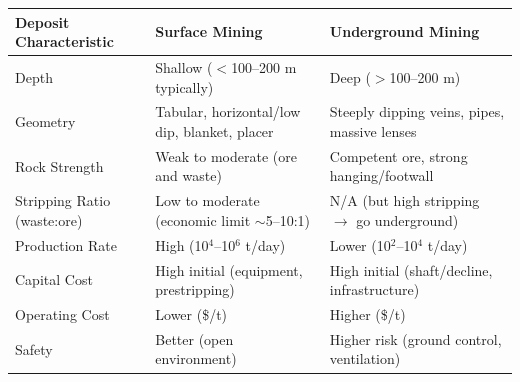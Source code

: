 \documentclass[11pt]{article}
\begin{document}
\begin{propriete}
\begin{center}
\begin{tabularx}{\linewidth}{|l|X|X|}
\hline
\rowcolor{popblueL} \textbf{Deposit Characteristic} & \textbf{Surface Mining} & \textbf{Underground Mining} \\
\hline
Depth & Shallow ($<$100--200 m typically) & Deep ($>$100--200 m) \\
\hline
Geometry & Tabular, horizontal/low dip, blanket, placer & Steeply dipping veins, pipes, massive lenses \\
\hline
Rock Strength & Weak to moderate (ore and waste) & Competent ore, strong hanging/footwall \\
\hline
Stripping Ratio (waste:ore) & Low to moderate (economic limit $\sim$5--10:1) & N/A (but high stripping $\rightarrow$ go underground) \\
\hline
Production Rate & High (10$^4$--10$^6$ t/day) & Lower (10$^2$--10$^4$ t/day) \\
\hline
Capital Cost & High initial (equipment, prestripping) & High initial (shaft/decline, infrastructure) \\
\hline
Operating Cost & Lower (\$/t) & Higher (\$/t) \\
\hline
Safety & Better (open environment) & Higher risk (ground control, ventilation) \\
\hline
\end{tabularx}
\end{center}
\end{propriete}
\end{document}
